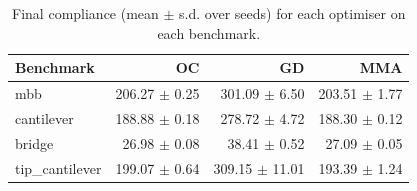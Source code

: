 \begin{table}[htbp]
\centering
\caption{Final compliance (mean $\pm$ s.d. over seeds) for each optimiser on each benchmark.}
\label{tab:multibench}
\begin{tabular}{lrrr}
\toprule
Benchmark & OC & GD & MMA \\
\midrule
mbb & 206.27 $\pm$ 0.25 & 301.09 $\pm$ 6.50 & 203.51 $\pm$ 1.77 \\
cantilever & 188.88 $\pm$ 0.18 & 278.72 $\pm$ 4.72 & 188.30 $\pm$ 0.12 \\
bridge & 26.98 $\pm$ 0.08 & 38.41 $\pm$ 0.52 & 27.09 $\pm$ 0.05 \\
tip_cantilever & 199.07 $\pm$ 0.64 & 309.15 $\pm$ 11.01 & 193.39 $\pm$ 1.24 \\
\bottomrule
\end{tabular}
\end{table}
